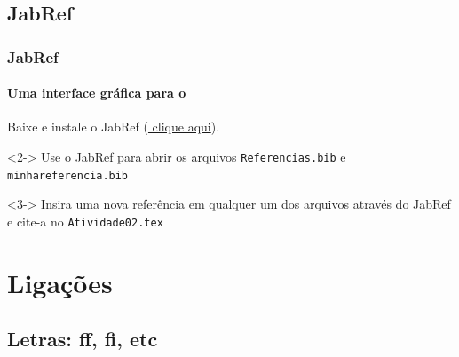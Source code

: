 \documentclass[handout,10pt]{beamer}
\begin{document}
\subsection{JabRef}
\begin{frame}
	\frametitle{JabRef}
	\framesubtitle{Uma interface gráfica para o \bibtex}
	
	\begin{atividade}{}
		Baixe e instale o JabRef
		(\href{http://cepa.if.usp.br/ivan/LaTeX/JabRef/}{%
		\color{blue}clique aqui}).
	\end{atividade}\vfill

	\begin{atividade}<2->{}
		Use o JabRef para abrir os arquivos \texttt{Referencias.bib} e
		\texttt{minhareferencia.bib}
	\end{atividade}\vfill
	
	\begin{atividade}<3->{}
		Insira uma nova referência em qualquer um dos arquivos através do JabRef e
		cite-a no \texttt{Atividade02.tex}
	\end{atividade}

\end{frame}
\section{Ligações}
\subsection{Letras: ff, fi, etc}
\end{document}
